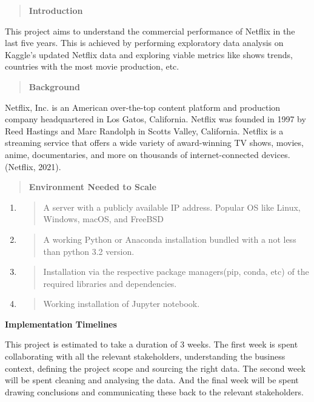 \documentclass[]{article}
\begin{document}
\begin{quote}
\textbf{Introduction}
\end{quote}

This project aims to understand the commercial performance of Netflix in
the last five years. This is achieved by performing exploratory data
analysis on Kaggle's updated Netflix data and exploring viable metrics
like shows trends, countries with the most movie production, etc.

\begin{quote}
\textbf{Background}
\end{quote}

Netflix, Inc. is an American over-the-top content platform and
production company headquartered in Los Gatos, California. Netflix was
founded in 1997 by Reed Hastings and Marc Randolph in Scotts Valley,
California. Netflix is a streaming service that offers a wide variety of
award-winning TV shows, movies, anime, documentaries, and more on
thousands of internet-connected devices. (Netflix, 2021).

\begin{quote}
\textbf{Environment Needed to Scale }
\end{quote}

\begin{enumerate}
\def\labelenumi{\arabic{enumi}.}
\item
  \begin{quote}
  A server with a publicly available IP address. Popular OS like Linux,
  Windows, macOS, and FreeBSD
  \end{quote}
\item
  \begin{quote}
  A working Python or Anaconda installation bundled with a not less than
  python 3.2 version.
  \end{quote}
\item
  \begin{quote}
  Installation via the respective package managers(pip, conda, etc) of
  the required libraries and dependencies.
  \end{quote}
\item
  \begin{quote}
  Working installation of Jupyter notebook.
  \end{quote}
\end{enumerate}

\textbf{Implementation Timelines}

This project is estimated to take a duration of 3 weeks. The first week
is spent collaborating with all the relevant stakeholders, understanding
the business context, defining the project scope and sourcing the right
data. The second week will be spent cleaning and analysing the data. And
the final week will be spent drawing conclusions and communicating these
back to the relevant stakeholders.
\end{document}
